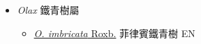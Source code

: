 
  \begin{itemize}
 \item[] \textit{Olax} 鐵青樹屬
                                
  \begin{itemize}
        \item[] \href{http://www.theplantlist.org/tpl1.1/search?q=Olax+imbricata}{\textit{O. imbricata} Roxb.}   菲律賓鐵青樹   EN
  \end{itemize}
  \end{itemize}
